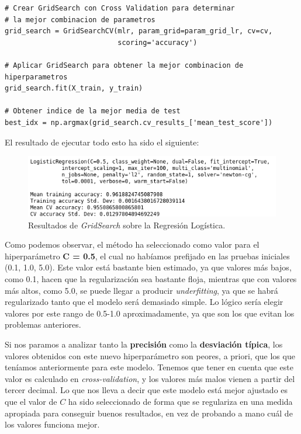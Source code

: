 \documentclass[11pt,a4paper]{article}
\begin{document}
\begin{lstlisting}
# Crear GridSearch con Cross Validation para determinar
# la mejor combinacion de parametros
grid_search = GridSearchCV(mlr, param_grid=param_grid_lr, cv=cv,
                           scoring='accuracy')

# Aplicar GridSearch para obtener la mejor combinacion de hiperparametros
grid_search.fit(X_train, y_train)

# Obtener indice de la mejor media de test
best_idx = np.argmax(grid_search.cv_results_['mean_test_score'])

\end{lstlisting}

El resultado de ejecutar todo esto ha sido el siguiente:

\begin{figure}[H]
    \centering
    \includegraphics[scale=0.8]{img/gs-lr.png}
    \caption{Resultados de \textit{GridSearch} sobre la Regresión Logística.}
    \label{fig:gs-lr}
\end{figure}

Como podemos observar, el método ha seleccionado como valor para el hiperparámetro \textbf{C = 0.5}, el cual no habíamos prefijado en las pruebas
iniciales (0.1, 1.0, 5.0). Este valor está bastante bien estimado, ya que valores más bajos, como 0.1, hacen que la regularización sea bastante
floja, mientras que con valores más altos, como 5.0, se puede llegar a producir \textit{underfitting}, ya que se habrá regularizado tanto que el
modelo será demasiado simple. Lo lógico sería elegir valores por este rango de 0.5-1.0 aproximadamente, ya que son los que evitan los problemas
anteriores.

Si nos paramos a analizar tanto la \textbf{precisión} como la \textbf{desviación típica}, los valores obtenidos con este nuevo hiperparámetro son peores, a
priori, que los que teníamos anteriormente para este modelo. Tenemos que tener en cuenta que este valor es calculado en \textit{cross-validation}, y los
valores más malos vienen a partir del tercer decimal. Lo que nos lleva a decir que este modelo está mejor ajustado es que el valor de $C$ ha sido
seleccionado de forma que se regulariza en una medida apropiada para conseguir buenos resultados, en vez de probando a mano cuál de los valores
funciona mejor.
\end{document}
